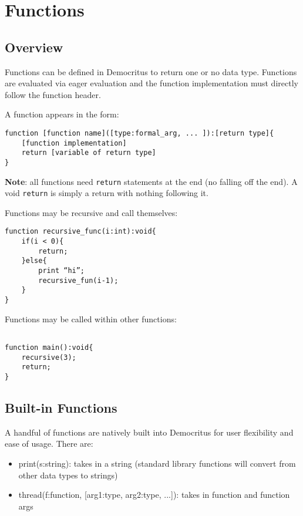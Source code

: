 \chapter{Functions}
    \section{Overview}
        Functions can be defined in Democritus to return one or no data type.  Functions are evaluated via eager evaluation and the function implementation must directly follow the function header.
        
        \vspace{5mm}
        \noindent A function appears in the form:
        
        \begin{lstlisting}
function [function name]([type:formal_arg, ... ]):[return type]{
    [function implementation]
    return [variable of return type]
}
        \end{lstlisting}

        \noindent \textbf{Note}: all functions need \texttt{return} statements at the end (no falling off the end). A void \texttt{return} is simply a return with nothing following it.

        \vspace{5mm}
        \noindent Functions may be recursive and call themselves:

        \begin{lstlisting}
function recursive_func(i:int):void{
    if(i < 0){
        return;
    }else{   
        print “hi”;
        recursive_fun(i-1);
    }
}
        \end{lstlisting}


        \noindent Functions may be called within other functions:
        \begin{lstlisting}

function main():void{
    recursive(3);
    return;
}
        \end{lstlisting}


    \section{Built-in Functions}
        A handful of functions are natively built into Democritus for user flexibility and ease of usage. There are:
        \begin{itemize}
            \item print(s:string): takes in a string (standard library functions will convert from other data types to strings)
            \item thread(f:function, [arg1:type, arg2:type, ...]): takes in function and function args
        \end{itemize}


